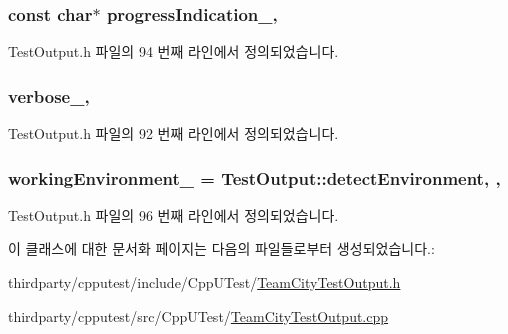 \subsubsection[{\texorpdfstring{progress\+Indication\+\_\+}{progressIndication_}}]{\setlength{\rightskip}{0pt plus 5cm}const char$\ast$ progress\+Indication\+\_\+\hspace{0.3cm}{\ttfamily [protected]}, {\ttfamily [inherited]}}\hypertarget{class_test_output_a4cbc8ea3886624399ab3879767d4f018}{}\label{class_test_output_a4cbc8ea3886624399ab3879767d4f018}


Test\+Output.\+h 파일의 94 번째 라인에서 정의되었습니다.

\subsubsection[{\texorpdfstring{verbose\+\_\+}{verbose_}}]{ verbose\+\_\+\hspace{0.3cm}{\ttfamily [protected]}, {\ttfamily [inherited]}}\hypertarget{class_test_output_a86126da532c138842a42d8e9a52b0806}{}\label{class_test_output_a86126da532c138842a42d8e9a52b0806}


Test\+Output.\+h 파일의 92 번째 라인에서 정의되었습니다.

\subsubsection[{\texorpdfstring{working\+Environment\+\_\+}{workingEnvironment_}}]{ working\+Environment\+\_\+ = {\bf Test\+Output\+::detect\+Environment}\hspace{0.3cm}{\ttfamily [static]}, {\ttfamily [protected]}, {\ttfamily [inherited]}}\hypertarget{class_test_output_a8b622cfce4b95599cd31b61a777d68ef}{}\label{class_test_output_a8b622cfce4b95599cd31b61a777d68ef}


Test\+Output.\+h 파일의 96 번째 라인에서 정의되었습니다.



이 클래스에 대한 문서화 페이지는 다음의 파일들로부터 생성되었습니다.\+:\begin{DoxyCompactItemize}
\item 
thirdparty/cpputest/include/\+Cpp\+U\+Test/\hyperlink{_team_city_test_output_8h}{Team\+City\+Test\+Output.\+h}\item 
thirdparty/cpputest/src/\+Cpp\+U\+Test/\hyperlink{_team_city_test_output_8cpp}{Team\+City\+Test\+Output.\+cpp}\end{DoxyCompactItemize}
